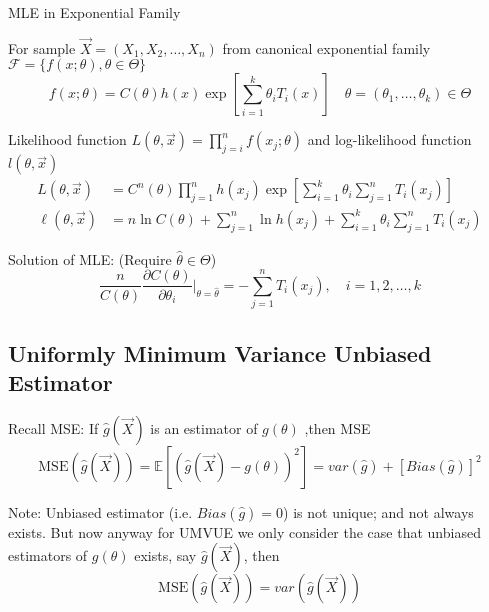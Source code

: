 \begin{point}
    MLE in Exponential Family
\end{point}


        For sample $\vec{X}=(X_1,X_2,\ldots,X_n)$ from canonical exponential family $\mathscr{F}=\{f(x;\theta),\theta\in\Theta\}$
        \begin{equation}
            f(x;\theta)=C(\theta)h(x)\exp\left[\sum_{i=1}^k\theta_iT_i(x)\right]\quad \theta=(\theta_1,\ldots,\theta_k)\in\Theta
        \end{equation}

        Likelihood function $L(\theta,\vec{x})=\prod_{j=i}^nf(x_j;\theta)$ and log-likelihood function $l(\theta,\vec{x})$
        \begin{align}
            L(\theta,\vec{x})&=C^n(\theta)\prod_{j=1}^nh(x_j)\exp\left[\sum_{i=1}^k\theta_i\sum_{j=1}^n T_i(x_j)\right]\\
            \ell(\theta,\vec{x})&=n\ln C(\theta)+\sum_{j=1}^n\ln h(x_j)+\sum_{i=1}^k\theta_i\sum_{j=1}^nT_i(x_j)
        \end{align}

        Solution of MLE: (Require $\hat{\theta}\in\Theta$)
        \begin{equation}
            \frac{n}{C(\theta)}\frac{\partial C(\theta)}{\partial \theta_i}\bigg|_{\theta=\hat{\theta}}=-\sum_{j=1}^nT_i(x_j),\quad i=1,2,\ldots,k    
        \end{equation}


\subsection{Uniformly Minimum Variance Unbiased Estimator}\label{SubSectionUMVUE}
        Recall MSE: If $\hat{g}(\vec{X})$ is an estimator of $g(\theta)$ ,then MSE
        \begin{equation}
            \mathrm{MSE}(\hat{g}(\vec{X}))=\mathbb{E}[(\hat{g}(\vec{X})-g(\theta))^2]=var(\hat{g})+[Bias(\hat{g})]^2
        \end{equation}

        Note:
    Unbiased estimator (i.e. $Bias(\hat{g})=0$) is not unique; and not always exists. But now anyway for UMVUE we only consider the case that unbiased estimators of $g(\theta)$ exists, say $\hat{g}(\vec{X})$, then
        \begin{equation} \mathrm{MSE}(\hat{g}(\vec{X}))=var(\hat{g}(\vec{X})) \end{equation}

